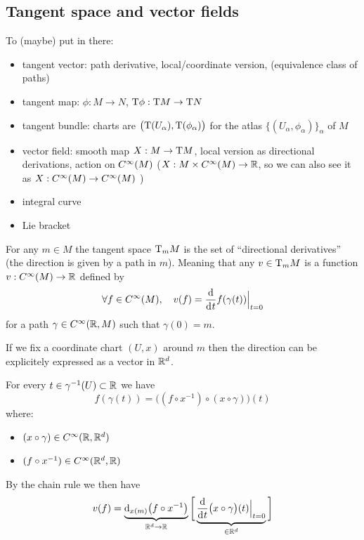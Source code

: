 	\subsection{Tangent space and vector fields}

		To (maybe) put in there:
		\begin{itemize}
			\item tangent vector: path derivative, local/coordinate version, (equivalence class of paths)
			\item tangent map: $\phi: M \to N$, $\mathrm{T}{\phi}: \mathrm{T}{M} \to \mathrm{T}{N}$
			\item tangent bundle: charts are $\big( \mathrm{T}(U_\alpha), \mathrm{T}(\phi_\alpha) \big)$ for the atlas $\big\{ (U_\alpha, \phi_\alpha) \big\}_\alpha$ of $M$
			\item vector field: smooth map $X: M \to \mathrm{T}{M}$, local version as directional derivations, action on $C^\infty(M)$ ($X: M \times C^\infty(M) \to \mathbb{R}$, so we can also see it as $X: C^\infty(M) \to C^\infty(M)$ )
			\item integral curve
			\item Lie bracket
		\end{itemize}

		For any $m \in M$ the tangent space $\mathrm{T}_m{M}$ is the set of ``directional derivatives'' (the direction is given by a path in $m$).
		Meaning that any $v \in \mathrm{T}_m{M}$ is a function $v: C^\infty(M) \to \mathbb{R}$ defined by
		$$
			\forall f \in \Cinf(M), \quad v(f) = \frac{\d}{\di{t}} f(\gamma(t)) \Big|_{t=0}
		$$
		for a path $\gamma \in C^\infty(\mathbb{R}, M)$ such that $\gamma(0) = m$.



		If we fix a coordinate chart $(U, x)$ around $m$ then the direction can be explicitely expressed as a vector in $\mathbb{R}^d$.

		For every $t \in \gamma^{-1}(U) \subset \mathbb{R}$ we have
		$$
			f(\gamma(t)) = \big( (f \circ x^{-1}) \circ (x \circ \gamma) \big)(t)
		$$
		where:
		\begin{itemize}
			\item $(x \circ \gamma) \in C^\infty(\mathbb{R}, \mathbb{R}^d)$
			\item $(f \circ x^{-1}) \in C^\infty(\mathbb{R}^d, \mathbb{R})$
		\end{itemize}
		By the chain rule we then have
		$$
			v(f) = \underbrace{\di[x(m)] \big( f \circ x^{-1} \big)}_{\R^d \to \R} \bigg[ \underbrace{\frac{\d}{\di{t}} \big( x \circ \gamma \big)(t) \Big|_{t=0}}_{\in \R^d} \bigg]
		$$

